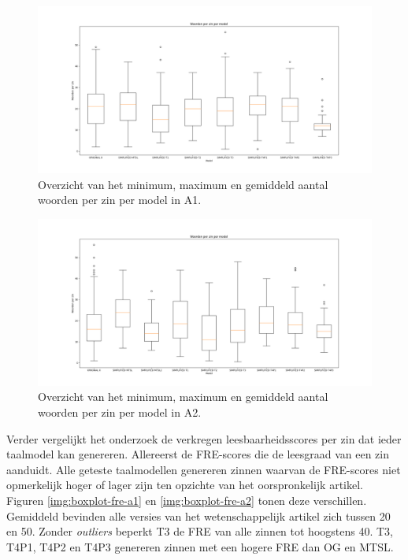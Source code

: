 \begin{figure}[H]
	\includegraphics[width=\linewidth]{img/boxplot-avg-a1.png}
	\caption{Overzicht van het minimum, maximum en gemiddeld aantal woorden per zin per model in A1.}
	\label{img:boxplot-min-max-avg-words-a1}
\end{figure}

\begin{figure}[H]
	\includegraphics[width=\linewidth]{img/boxplot-avg-a2.png}
	\caption{Overzicht van het minimum, maximum en gemiddeld aantal woorden per zin per model in A2.}
	\label{img:boxplot-min-max-avg-words-a2}
\end{figure}

Verder vergelijkt het onderzoek de verkregen leesbaarheidsscores per zin dat ieder taalmodel kan genereren. Allereerst de FRE-scores die de leesgraad van een zin aanduidt. Alle geteste taalmodellen genereren zinnen waarvan de FRE-scores niet opmerkelijk hoger of lager zijn ten opzichte van het oorspronkelijk artikel. Figuren \ref{img:boxplot-fre-a1} en \ref{img:boxplot-fre-a2} tonen deze verschillen. Gemiddeld bevinden alle versies van het wetenschappelijk artikel zich tussen 20 en 50. Zonder \textit{outliers} beperkt T3 de FRE van alle zinnen tot hoogstens 40. T3, T4P1, T4P2 en T4P3 genereren zinnen met een hogere FRE dan OG en MTSL. 

